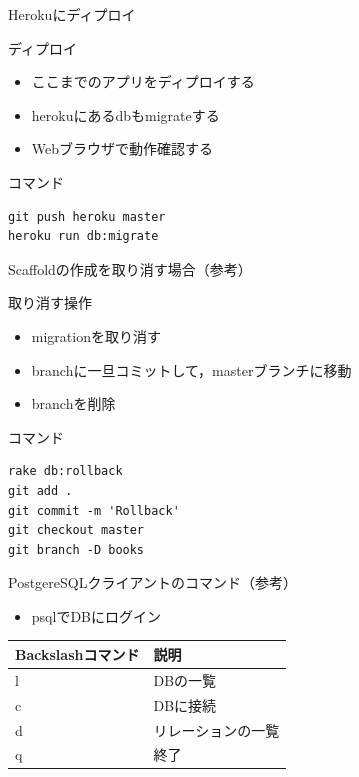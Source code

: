 \documentclass[t, aspectratio=169]{beamer}
\begin{document}
\begin{frame}[fragile,label=sec-7-1-7]{Herokuにディプロイ}
 \begin{block}{ディプロイ}
\begin{itemize}
\item ここまでのアプリをディプロイする
\item herokuにあるdbもmigrateする
\item Webブラウザで動作確認する
\end{itemize}
\end{block}

\begin{block}{コマンド}
\begin{verbatim}
git push heroku master
heroku run db:migrate
\end{verbatim}
\end{block}
\end{frame}
\begin{frame}[fragile,label=sec-7-1-8]{Scaffoldの作成を取り消す場合（参考）}
 \begin{block}{取り消す操作}
\begin{itemize}
\item migrationを取り消す
\item branchに一旦コミットして，masterブランチに移動
\item branchを削除
\end{itemize}
\end{block}

\begin{block}{コマンド}
\begin{verbatim}
rake db:rollback
git add .
git commit -m 'Rollback'
git checkout master
git branch -D books
\end{verbatim}
\end{block}
\end{frame}
\begin{frame}[label=sec-7-1-9]{PostgereSQLクライアントのコマンド（参考）}
\begin{itemize}
\item psqlでDBにログイン
\end{itemize}

\begin{center}
\begin{tabular}{ll}
Backslashコマンド & 説明\\
\hline
l & DBの一覧\\
c & DBに接続\\
d & リレーションの一覧\\
q & 終了\\
\end{tabular}
\end{center}
\end{frame}
\end{document}

